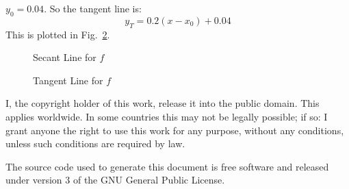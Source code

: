\documentclass{article}
\begin{document}
    $y_{0}=0.04$. So the tangent line is:
    \begin{equation}
        y_{T}=0.2(x-x_{0})+0.04
    \end{equation}
    This is plotted in Fig.~\ref{fig:tan_line}.
    \begin{figure}
        \centering
        \caption{Secant Line for $f$}
        \label{fig:sec_line}
    \end{figure}
    \begin{figure}
        \centering
        \caption{Tangent Line for $f$}
        \label{fig:tan_line}
    \end{figure}
    \newpage
    I, the copyright holder of this work, release it into the public domain.
    This applies worldwide. In some countries this may not be legally possible;
    if so: I grant anyone the right to use this work for any purpose, without
    any conditions, unless such conditions are required by law.
    \par\hfill\par
    The source code used to generate this document is free software and released
    under version 3 of the GNU General Public License.
\end{document}
